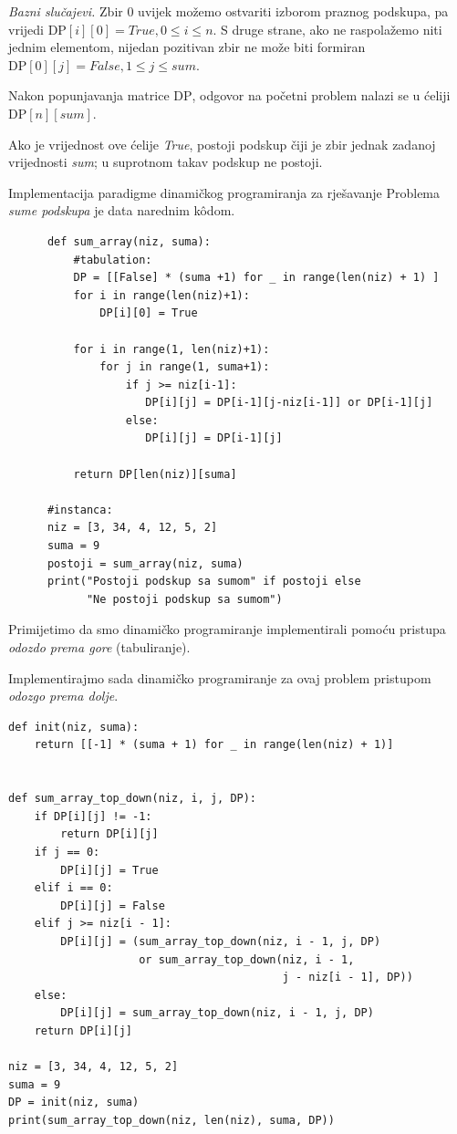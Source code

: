 \begin{solution}
	\medskip
	
	\textit{Bazni slučajevi.}  	Zbir $0$ uvijek možemo ostvariti izborom praznog podskupa, pa vrijedi $
	\textrm{DP}[i][0]=True, 
	0\leq i\leq n.$ 	S druge strane, ako ne raspolažemo niti jednim elementom, nijedan pozitivan zbir ne može biti formiran $ \textrm{DP}[0][j]=False, 1\leq j\leq sum.
	$
	
	\medskip
	
	Nakon popunjavanja matrice $\textrm{DP}$, odgovor na početni problem nalazi se u ćeliji $\textrm{DP}[n][sum].$
	
	Ako je vrijednost ove ćelije \textit{True}, postoji podskup čiji je zbir jednak zadanoj vrijednosti \textit{sum}; u suprotnom takav podskup ne postoji.
	
\end{solution}

   
    Implementacija paradigme dinamičkog programiranja za rješavanje Pro\-blema \emph{sume podskupa} je data narednim k\^odom. 
   
   \begin{verbatim}
   	  def sum_array(niz, suma):
   	      #tabulation:
   	      DP = [[False] * (suma +1) for _ in range(len(niz) + 1) ]
   	      for i in range(len(niz)+1):
   	          DP[i][0] = True
   	      
   	      for i in range(1, len(niz)+1):   
   	          for j in range(1, suma+1):
   	              if j >= niz[i-1]:
   	                 DP[i][j] = DP[i-1][j-niz[i-1]] or DP[i-1][j]
   	              else:
   	                 DP[i][j] = DP[i-1][j]
   	                 
   	      return DP[len(niz)][suma]
   	  
   	  #instanca:
   	  niz = [3, 34, 4, 12, 5, 2]
   	  suma = 9
   	  postoji = sum_array(niz, suma)
   	  print("Postoji podskup sa sumom" if postoji else  
   	        "Ne postoji podskup sa sumom")
   \end{verbatim}

Primijetimo da smo dinamičko programiranje implementirali pomoću pristupa \textit{odozdo prema gore} (tabuliranje). 

Implementirajmo sada dinamičko programiranje za ovaj problem pristupom \textit{odozgo prema dolje}.

   \begin{verbatim}
def init(niz, suma):
    return [[-1] * (suma + 1) for _ in range(len(niz) + 1)]


def sum_array_top_down(niz, i, j, DP):
    if DP[i][j] != -1:
        return DP[i][j]
    if j == 0:
        DP[i][j] = True
    elif i == 0:
        DP[i][j] = False
    elif j >= niz[i - 1]:
        DP[i][j] = (sum_array_top_down(niz, i - 1, j, DP)
                    or sum_array_top_down(niz, i - 1,
                                          j - niz[i - 1], DP))
    else:
        DP[i][j] = sum_array_top_down(niz, i - 1, j, DP)
    return DP[i][j]

niz = [3, 34, 4, 12, 5, 2]
suma = 9
DP = init(niz, suma)
print(sum_array_top_down(niz, len(niz), suma, DP))
\end{verbatim}  


